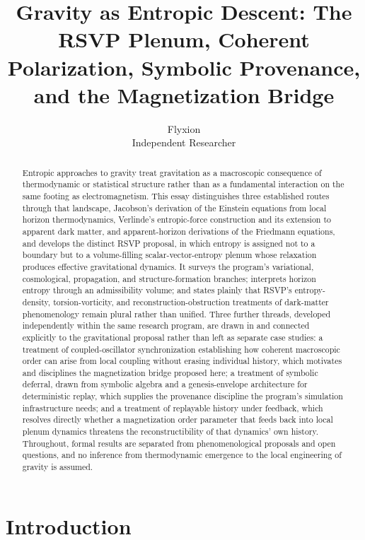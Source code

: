 \documentclass[11pt]{article}
\title{Gravity as Entropic Descent: The RSVP Plenum, Coherent Polarization, Symbolic Provenance, and the Magnetization Bridge}
\author{Flyxion \\ \small Independent Researcher}
\date{}
\begin{document}
\maketitle

\begin{abstract}
Entropic approaches to gravity treat gravitation as a macroscopic consequence of thermodynamic or statistical structure rather than as a fundamental interaction on the same footing as electromagnetism. This essay distinguishes three established routes through that landscape, Jacobson's derivation of the Einstein equations from local horizon thermodynamics, Verlinde's entropic-force construction and its extension to apparent dark matter, and apparent-horizon derivations of the Friedmann equations, and develops the distinct RSVP proposal, in which entropy is assigned not to a boundary but to a volume-filling scalar-vector-entropy plenum whose relaxation produces effective gravitational dynamics. It surveys the program's variational, cosmological, propagation, and structure-formation branches; interprets horizon entropy through an admissibility volume; and states plainly that RSVP's entropy-density, torsion-vorticity, and reconstruction-obstruction treatments of dark-matter phenomenology remain plural rather than unified. Three further threads, developed independently within the same research program, are drawn in and connected explicitly to the gravitational proposal rather than left as separate case studies: a treatment of coupled-oscillator synchronization establishing how coherent macroscopic order can arise from local coupling without erasing individual history, which motivates and disciplines the magnetization bridge proposed here; a treatment of symbolic deferral, drawn from symbolic algebra and a genesis-envelope architecture for deterministic replay, which supplies the provenance discipline the program's simulation infrastructure needs; and a treatment of replayable history under feedback, which resolves directly whether a magnetization order parameter that feeds back into local plenum dynamics threatens the reconstructibility of that dynamics' own history. Throughout, formal results are separated from phenomenological proposals and open questions, and no inference from thermodynamic emergence to the local engineering of gravity is assumed.
\end{abstract}

\section{Introduction}
\label{sec:introduction}
\end{document}

